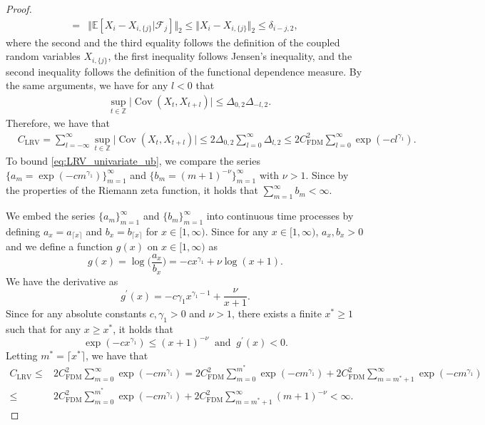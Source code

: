 \documentclass[11pt]{article}
\DeclareMathOperator*{\cov}{Cov}
\theoremstyle{plain}
\theoremstyle{definition}
\begin{document}
\begin{proof}
\begin{align*}
       =& \Vert\mathbb{E}[X_i-X_{i,\{j\}}| \mathcal{F}_{j}]\Vert_2 \leq \Vert X_{i}-X_{i,\{j\}}\Vert_2 \leq \delta_{i-j,2},    
    \end{align*}
    where the second and the third equality follows the definition of the coupled random variables $X_{i,\{j\}}$, the first inequality follows Jensen's inequality, and the second inequality follows the definition of the functional dependence measure. By the same arguments, we have for any $l < 0$ that
    \begin{equation*}
    \begin{aligned}
        &\sup_{t \in \mathbb{Z}}\big|\cov(X_t, X_{t+l})\big| \leq \Delta_{0,2}\Delta_{-l,2}.
    \end{aligned}
    \end{equation*}
Therefore, we have that
\begin{equation}\label{eq:LRV_univariate_ub}
\begin{aligned}
    &C_{\mathrm{LRV}} = \sum_{l = -\infty}^{\infty}\sup_{t \in \mathbb{Z}}\big|\cov(X_t, X_{t+l})\big| \leq 2\Delta_{0,2}\sum_{l = 0}^{\infty}\Delta_{l,2} \leq 2C_{\mathrm{FDM}}^2\sum_{l = 0}^{\infty}\exp(-cl^{\gamma_1}).
\end{aligned}
\end{equation}
To bound \eqref{eq:LRV_univariate_ub}, we compare the series $\{a_m = \exp(-cm^{\gamma_1})\}_{m = 1}^{\infty}$ and $\{b_m = (m+1)^{-\nu}\}_{m=1}^{\infty}$ with $\nu > 1$. Since by the properties of the Riemann zeta function, it holds that $\sum_{m = 1}^{\infty}b_m < \infty$.

We embed the series $\{a_m\}_{m = 1}^{\infty}$ and $\{b_m\}_{m=1}^{\infty}$ into continuous time processes by defining $a_x = a_{\lceil x \rceil}$ and $b_x = b_{\lceil x \rceil}$ for $x \in [1,\infty)$. Since for any $x \in [1,\infty)$, $a_x, b_x > 0$ and we define a function $g(x)$ on $x \in [1, \infty)$ as
\begin{equation*}
    g(x) = \log\bigg(\frac{a_x}{b_x}\bigg) = -cx^{\gamma_1} + \nu\log(x+1).
\end{equation*}
We have the derivative as
\begin{equation*}
    g^{\prime}(x) = -c\gamma_1x^{\gamma_1-1} + \frac{\nu}{x+1}.
\end{equation*}
Since for any absolute constants $c, \gamma_1 > 0$ and $\nu > 1$, there exists a finite $x^* \geq 1$ such that for any $x \geq x^*$, it holds that
\begin{equation*}
    \exp(-cx^{\gamma_1}) \leq (x+1)^{-\nu} \;\; \text{and} \;\; g^{\prime}(x) < 0.
\end{equation*}
Letting $m^* = \lceil x^* \rceil$, we have that
\begin{align*}
    C_{\mathrm{LRV}} \leq& 2C_{\mathrm{FDM}}^2\sum_{m = 0}^{\infty}\exp(-cm^{\gamma_1}) = 2C_{\mathrm{FDM}}^2\sum_{m = 0}^{m^*}\exp(-cm^{\gamma_1}) + 2C_{\mathrm{FDM}}^2\sum_{m = m^*+1}^{\infty}\exp(-cm^{\gamma_1})\\
    \leq& 2C_{\mathrm{FDM}}^2\sum_{m = 0}^{m^*}\exp(-cm^{\gamma_1}) + 2C_{\mathrm{FDM}}^2\sum_{m = m^*+1}^{\infty}(m + 1)^{-\nu} < \infty.    
\end{align*}
\end{proof}
\end{document}
